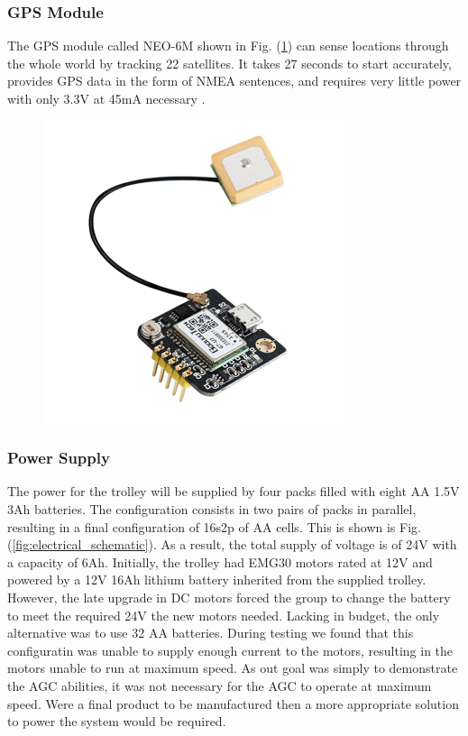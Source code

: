 \documentclass[11pt,landscape]{article}
\begin{document}
\begin{multicols}{3}
\subsubsection{GPS Module}
The GPS module called NEO-6M shown in Fig. (\ref{fig:gps_module}) can sense
locations through the whole world by tracking 22 satellites. It takes 27 seconds
to start accurately, provides GPS data in the form of NMEA sentences, and
requires very little power with only 3.3V at 45mA necessary \cite{neo_gps}.

\begin{figure}[H]
    \begin{center}
        \includegraphics[]{gps_module.png}
        \label{fig:gps_module}
    \end{center}
\end{figure}


\subsubsection{Power Supply}
The power for the trolley will be supplied by four packs filled with eight AA
1.5V 3Ah batteries. The configuration consists in two pairs of packs in
parallel, resulting in a final configuration of 16s2p of AA cells. This is shown
is Fig. (\ref{fig:electrical_schematic}). As a result, the total supply of
voltage is of 24V with a capacity of 6Ah. Initially, the trolley had EMG30
motors rated at 12V and powered by a 12V 16Ah lithium battery inherited from the
supplied trolley. However, the late upgrade in DC motors forced the group to
change the battery to meet the required 24V the new motors needed. Lacking in
budget, the only alternative was to use 32 AA batteries. During testing we found
that this configuratin was unable to supply enough current to the motors,
resulting in the motors unable to run at maximum speed. As out goal was simply
to demonstrate the AGC abilities, it was not necessary for the AGC to operate at
maximum speed. Were a final product to be manufactured then a more
appropriate solution to power the system would be required.


\end{multicols}
\end{document}
